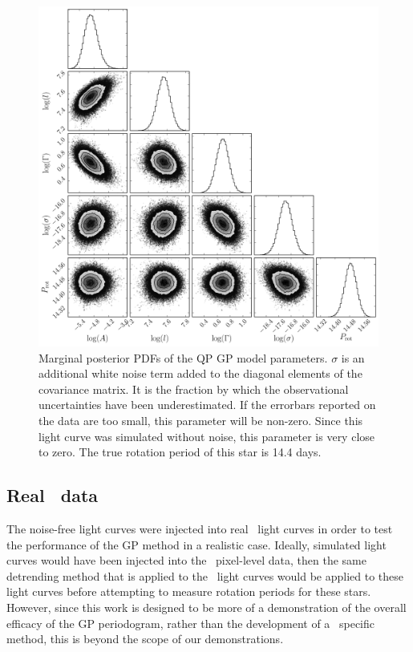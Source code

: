 \begin{figure}
\begin{center}
\includegraphics[width=6in, clip=true]{figures/demo_triangle.pdf}
\caption{Marginal posterior PDFs of the QP GP model parameters. $\sigma$ is an
additional white noise term added to the diagonal elements of the covariance
matrix. It is the fraction by which the observational uncertainties have been
underestimated. If the errorbars reported on the data are too small, this
parameter will be non-zero. Since this light curve was simulated without
noise, this parameter is very close to zero.
The true rotation period of this star is 14.4 days.}
\label{fig:gp_posteriors}
\end{center}
\end{figure}

\subsection{Real \kepler\ data}

The noise-free light curves were injected into real \kepler\ light curves in
order to test the performance of the GP method in a realistic case.
Ideally, simulated light curves would have been injected into the \kepler\
pixel-level data, then the same detrending method that is applied to the
\kepler\ light curves would be applied to these light curves before attempting
to measure rotation periods for these stars.
However, since this work is designed to be more of a demonstration of the
overall efficacy of the GP periodogram, rather than the development of a
\Kepler\ specific method, this is beyond the scope of our demonstrations.

